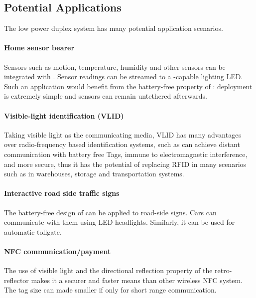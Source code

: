 \subsection{Potential Applications}
The low power duplex \retro system has many potential application scenarios. 

\paragraph{Home sensor bearer} Sensors such as motion, temperature, humidity and other sensors can be integrated with \vitag. Sensor readings can be streamed to a \reader-capable lighting LED. Such an application would benefit from the battery-free property of \vitag: deployment is extremely simple and sensors can remain untethered afterwards.   

\paragraph{Visible-light identification (VLID)} Taking visible light as the communicating media, VLID has many advantages over radio-frequency based identification systems, such as can achieve distant communication with battery free Tags, immune to electromagnetic interference, and more secure, thus it has the potential of replacing RFID in many scenarios such as in warehouses, storage and transportation systems.

\paragraph{Interactive road side traffic signs} The battery-free design of \vitag can be applied to road-side signs. Cars can communicate with them using LED headlights. Similarly, it can be used for automatic tollgate. 

\paragraph{NFC communication/payment} The use of visible light and the directional reflection property of the retro-reflector makes it a securer and faster means than other wireless NFC system.  The tag size can made smaller if only for short range communication. 
